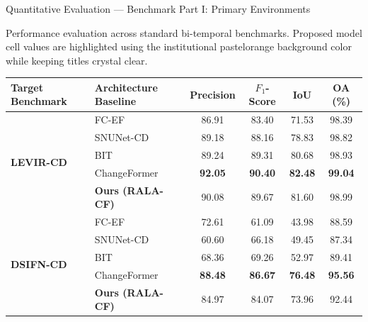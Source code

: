 \documentclass[aspectratio=169]{beamer}
\begin{document}
\begin{frame}{Quantitative Evaluation — Benchmark Part I: Primary Environments}

\centering
{\footnotesize Performance evaluation across standard bi-temporal benchmarks. Proposed model cell values are highlighted using the institutional pastelorange background color while keeping titles crystal clear.}
\vskip 0.25cm

\renewcommand{\arraystretch}{1.15}
\small
\begin{tabular}{|l|l|c|c|c|c|}
\hline
\textbf{Target Benchmark} & \textbf{Architecture Baseline} & \textbf{Precision} & \textbf{$F_1$-Score} & \textbf{IoU} & \textbf{OA (\%)} \\
\hline
\hline
\multirow{5}{*}{\textbf{LEVIR-CD}} & FC-EF & 86.91 & 83.40 & 71.53 & 98.39 \\ \cline{2-6}
                          & SNUNet-CD & 89.18 & 88.16 & 78.83 & 98.82 \\ \cline{2-6}
                          & BIT & 89.24 & 89.31 & 80.68 & 98.93 \\ \cline{2-6}
                          & ChangeFormer & \textbf{92.05} & \textbf{90.40} & \textbf{82.48} & \textbf{99.04} \\ \cline{2-6}
                          & \textbf{Ours (RALA-CF)} & \cellcolor{pastelorange} 90.08 & \cellcolor{pastelorange} 89.67 & \cellcolor{pastelorange} 81.60 & \cellcolor{pastelorange} 98.99 \\
\hline
\hline
\multirow{5}{*}{\textbf{DSIFN-CD}} & FC-EF & 72.61 & 61.09 & 43.98 & 88.59 \\ \cline{2-6}
                          & SNUNet-CD & 60.60 & 66.18 & 49.45 & 87.34 \\ \cline{2-6}
                          & BIT & 68.36 & 69.26 & 52.97 & 89.41 \\ \cline{2-6}
                          & ChangeFormer & \textbf{88.48} & \textbf{86.67} & \textbf{76.48} & \textbf{95.56} \\ \cline{2-6}
                          & \textbf{Ours (RALA-CF)} & \cellcolor{pastelorange} 84.97 & \cellcolor{pastelorange} 84.07 & \cellcolor{pastelorange} 73.96 & \cellcolor{pastelorange} 92.44 \\
\hline
\end{tabular}

\end{frame}
\end{document}
